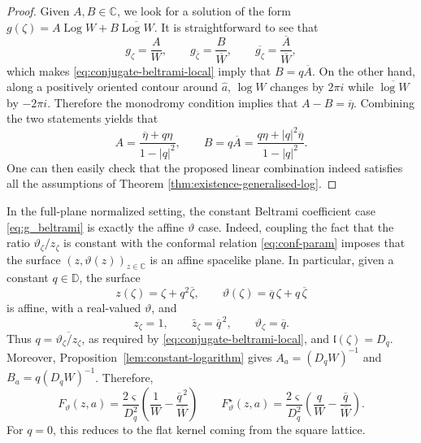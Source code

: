 \documentclass[reqno]{amsart}
\numberwithin{equation}{section}
\theoremstyle{definition}
\theoremstyle{remark}
\providecommand{\Log}{\operatorname{Log}}
\providecommand{\ellm}{\mathfrak l}
\providecommand{\hata}{\widehat a}
\begin{document}
\begin{proof}
Given $A,B\in \mathbb{C}$, we look for a solution of the form $ g(\zeta)=A\Log W+B\overline{\Log W}$. It is straightforward to see that 
\begin{equation}\label{eq:constant-proof-derivatives}
        g_\zeta=\frac{A}{W},
        \qquad
        g_{\bar\zeta}=\frac{B}{\overline W},
        \qquad
        \overline{g_\zeta}=\frac{\overline A}{\overline W},
\end{equation}
which makes \eqref{eq:conjugate-beltrami-local} imply that $B=q\overline A$. On the other hand, along a positively oriented contour around $\hata$, $\log W$ changes by $2\pi i$ while $\overline{\log W}$ by $-2\pi i$.  Therefore the monodromy condition implies that $ A-B=\overline\eta$. Combining the two statements yields that 
\begin{equation}\label{eq:constant-proof-A}
        A=\frac{\overline\eta+q\eta}{1-|q|^2},
        \qquad
        B=q\overline A
        =\frac{q\eta+|q|^2\overline\eta}{1-|q|^2}.
\end{equation}
One can then easily check that the proposed linear combination indeed satisfies all the assumptions of Theorem \ref{thm:existence-generalised-log}. 
\end{proof}


In the full-plane normalized setting, the constant Beltrami coefficient case \eqref{eq:g_beltrami} is exactly the affine $\vartheta$ case. Indeed, coupling the fact that the ratio $\vartheta_\zeta/z_\zeta$ is constant with the conformal relation \eqref{eq:conf-param} imposes that the surface $(z,\vartheta(z))_{z\in \mathbb{C}}$ is an affine spacelike plane. In particular, given a constant $q\in\mathbb{D}$, the surface
\begin{equation}\label{eq:canonical-constant-surface}
        z(\zeta)=\zeta+q^2\overline\zeta,
        \qquad
        \vartheta(\zeta)=\overline q\,\zeta+q\,\overline\zeta
\end{equation}
is affine, with a real-valued $\vartheta$, and
\begin{equation}\label{eq:canonical-constant-derivatives}
        z_\zeta=1,
        \qquad
        \bar z_\zeta=\overline q^{\,2},
        \qquad
        \vartheta_\zeta=\overline q.
\end{equation}
Thus $q=\overline{\vartheta_\zeta/z_\zeta}$, as required by \eqref{eq:conjugate-beltrami-local}, and $\ellm(\zeta)=D_q$. Moreover, Proposition~\ref{lem:constant-logarithm} gives $A_a=(D_qW)^{-1}$ and $B_a=q(D_qW)^{-1}$. Therefore,
\begin{equation}\label{eq:constant-F-Fstar-canonical}
        F_\vartheta(z,a)
        =\frac{2\varsigma}{D_q^2}
        \left(
        \frac{1}{W}-\frac{\overline q^{\,2}}{\overline W}
        \right)
        \qquad
        F^\star_\vartheta(z,a)
        =\frac{2\varsigma}{D_q^2}
        \left(
        \frac{q}{W}-\frac{\overline q}{\overline W}
        \right).
\end{equation}
For $q=0$, this reduces to the flat kernel coming from the square lattice.
\end{document}

